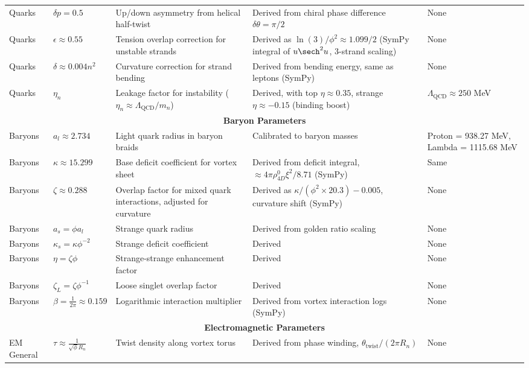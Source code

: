 \begin{sidewaystable}[p]
\begin{tabularx}{\linewidth}{|p{2cm}|p{3cm}|X|X|p{3cm}|}
Quarks & $\delta p = 0.5$ & Up/down asymmetry from helical half-twist & Derived from chiral phase difference $\delta \theta = \pi / 2$ & None \\
Quarks & $\epsilon \approx 0.55$ & Tension overlap correction for unstable strands & Derived as $\ln(3)/\phi^2 \approx 1.099 / 2$ (SymPy integral of $u \sech^2 u$, 3-strand scaling) & None \\
Quarks & $\delta \approx 0.004 n^2$ & Curvature correction for strand bending & Derived from bending energy, same as leptons (SymPy) & None \\
Quarks & $\eta_n$ & Leakage factor for instability ($\eta_n \approx \Lambda_{\text{QCD}} / m_n$) & Derived, with top $\eta \approx 0.35$, strange $\eta \approx -0.15$ (binding boost) & $\Lambda_{\text{QCD}} \approx 250$ MeV \\
\hline
\multicolumn{5}{|c|}{\textbf{Baryon Parameters}} \\
\hline
Baryons & $a_l \approx 2.734$ & Light quark radius in baryon braids & Calibrated to baryon masses & Proton = 938.27 MeV, Lambda = 1115.68 MeV \\
Baryons & $\kappa \approx 15.299$ & Base deficit coefficient for vortex sheet & Derived from deficit integral, $\approx 4 \pi \rho_{4D}^0 \xi^2 / 8.71$ (SymPy) & Same \\
Baryons & $\zeta \approx 0.288$ & Overlap factor for mixed quark interactions, adjusted for curvature & Derived as $\kappa / (\phi^2 \times 20.3) - 0.005$, curvature shift (SymPy) & None \\
Baryons & $a_s = \phi a_l$ & Strange quark radius & Derived from golden ratio scaling & None \\
Baryons & $\kappa_s = \kappa \phi^{-2}$ & Strange deficit coefficient & Derived & None \\
Baryons & $\eta = \zeta \phi$ & Strange-strange enhancement factor & Derived & None \\
Baryons & $\zeta_L = \zeta \phi^{-1}$ & Loose singlet overlap factor & Derived & None \\
Baryons & $\beta = \frac{1}{2\pi} \approx 0.159$ & Logarithmic interaction multiplier & Derived from vortex interaction logs (SymPy) & None \\
\hline
\multicolumn{5}{|c|}{\textbf{Electromagnetic Parameters}} \\
\hline
EM General & $\tau \approx \frac{1}{\sqrt{\phi} R_n}$ & Twist density along vortex torus & Derived from phase winding, $\theta_{\text{twist}} / (2\pi R_n)$ & None \\

\end{tabularx}
\end{sidewaystable}
